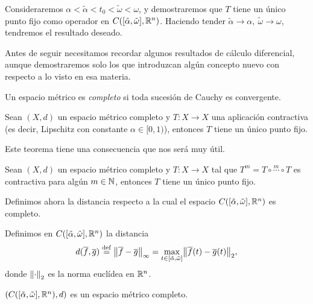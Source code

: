 \documentclass[../ecuaciones_diferenciales.tex]{subfiles}
\begin{document}
Consideraremos \(\alpha < \tilde{\alpha} < t_0 < \tilde{\omega} < \omega\), y
demostraremos que \(T\) tiene un único punto fijo como operador en
\(C([\tilde{\alpha}, \tilde{\omega}], \mathbb{R}^n)\). Haciendo tender \(\tilde{\alpha}
\to \alpha,\ \tilde{\omega} \to \omega\), tendremos el resultado deseado.

Antes de seguir necesitamos recordar algunos resultados de cálculo diferencial,
aunque demostraremos solo los que introduzcan algún concepto nuevo con respecto
a lo visto en esa materia.

\begin{definition}
	Un espacio métrico es \emph{completo} si toda sucesión de Cauchy es convergente.
\end{definition}

\begin{theorem}
	Sean \((X, d)\) un espacio métrico completo y \(T : X \to X\) una aplicación
	contractiva (es decir, Lipschitz con constante \(\alpha \in [0, 1)\)),
	entonces \(T\) tiene un único punto fijo.
\end{theorem}

Este teorema tiene una consecuencia que nos será muy útil.

\begin{corollary} \label{cor:banach_fixed_point}
	Sean \((X, d)\) un espacio métrico completo y \(T : X \to X\) tal que
	\(T^m = T \circ \overset{m}{\cdots} \circ T\) es contractiva para algún
	\(m \in \mathbb{N}\), entonces \(T\) tiene un único punto fijo.
\end{corollary}

Definimos ahora la distancia respecto a la cual el espacio
\(C([\tilde{\alpha}, \tilde{\omega}], \mathbb{R}^n)\) es completo.

\begin{definition}
	Definimos en \(C([\tilde{\alpha}, \tilde{\omega}], \mathbb{R}^n)\) la distancia
	\[d(\vec{f}, \vec{g}) \assign \norm{\vec{f} - \vec{g}}_{\infty}
		= \max_{t \in [\tilde{\alpha}, \tilde{\omega}]}
			\norm{\vec{f}(t) - \vec{g}(t)}_2,\]
	donde \(\norm{\cdot}_2\) es la norma euclídea en \(\mathbb{R}^n\).
\end{definition}

\begin{proposition}
	\((C([\tilde{\alpha}, \tilde{\omega}], \mathbb{R}^n), d)\)
	es un espacio métrico completo.
\end{proposition}
\end{document}
